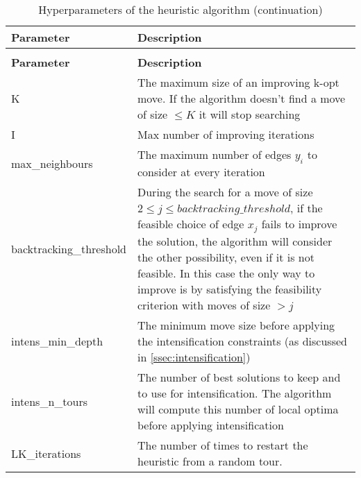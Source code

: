 
\renewcommand{\arraystretch}{1.5}
\setlength{\arrayrulewidth}{1.2pt}
\begin{longtable}{lX}
	\caption{Hyperparameters of the heuristic algorithm}\\
	\hline
	\rowcolor{myred} %
	\color{white}\textbf{Parameter} & \color{white}\textbf{Description}\\
	\hline
	\endfirsthead
	\rowcolor{white}
	\caption[]{Hyperparameters of the heuristic algorithm (continuation)}\\
	\hline
	\rowcolor{myred}
	\color{white}\textbf{Parameter} & \color{white}\textbf{Description}\\
	\hline
	\endhead
	\hline %
	\endlastfoot %
	K  & The maximum size of an improving k-opt move. If the algorithm doesn't find a move of size $\le K$ it will stop searching  \\
	I  & Max number of improving iterations \\
	max\_neighbours   & The maximum number of edges $y_i$ to consider at every iteration \\
	backtracking\_threshold & During the search for a move of size $2 \le j \le backtracking\_threshold$, if the feasible choice of edge $x_j$ fails to improve the solution, the algorithm will consider the other possibility, even if it is not feasible. In this case the only way to improve is by satisfying the feasibility criterion with moves of size $> j$\\
	intens\_min\_depth & The minimum move size before applying the intensification constraints (as discussed in \cref{ssec:intensification})\\
	intens\_n\_tours & The number of best solutions to keep and to use for intensification. The algorithm will compute this number of local optima before applying intensification\\
	LK\_iterations & The number of times to restart the heuristic from a random tour.
	\label{tab:hyperparameters} \\
\end{longtable}
\setlength{\arrayrulewidth}{1pt}
\renewcommand{\arraystretch}{1}